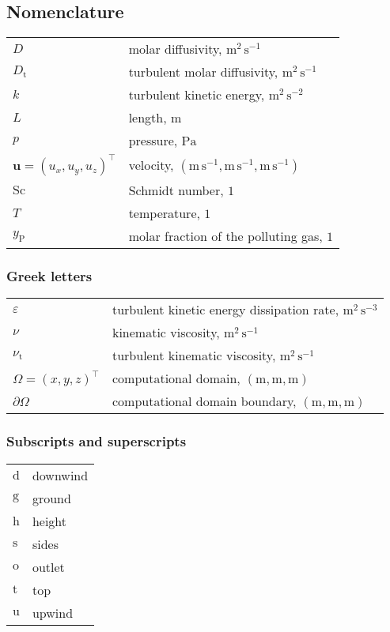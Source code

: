\cleardoublepage
\subsection*{Nomenclature}
\label{sec:nomen}

\begin{tabular}{ll}
$D$ & molar diffusivity, $\mathrm{m^2\,s^{-1}}$ \\
$D_{\mathrm{t}}$ & turbulent molar diffusivity, $\mathrm{m^2\,s^{-1}}$ \\
$k$ & turbulent kinetic energy, $\mathrm{m^2\,s^{-2}}$ \\
$L$ & length, $\mathrm{m}$ \\
$p$ & pressure, $\mathrm{Pa}$ \\
$\bm{u} = (u_x, u_y, u_z)^\intercal$ & velocity, $\mathrm{(m\,s^{-1},m\,s^{-1},m\,s^{-1})}$ \\
$\mathrm{Sc}$ & Schmidt number, $\mathrm{1}$ \\
${T}$ & temperature, $\mathrm{1}$ \\
$y_{\mathrm{P}}$ & molar fraction of the polluting gas, $\mathrm{1}$ \\
\end{tabular}

\subsubsection*{Greek letters}
\begin{tabular}{ll}
$\varepsilon$ & turbulent kinetic energy dissipation rate, $\mathrm{m^2\,s^{-3}}$\\
$\nu$ & kinematic viscosity, $\mathrm{m^2\,s^{-1}}$\\
$\nu_{\mathrm{t}}$ & turbulent kinematic viscosity, $\mathrm{m^2\,s^{-1}}$\\
$\Omega = (x,y,z)^\intercal$ & computational domain, $\mathrm{(m,m,m)}$\\
$\partial\Omega$ & computational domain boundary, $\mathrm{(m,m,m)}$\\
\end{tabular}

\subsubsection*{Subscripts and superscripts}
\begin{tabular}{ll}
$\mathrm{d}$ & downwind \\
$\mathrm{g}$ & ground \\
$\mathrm{h}$ & height \\
$\mathrm{s}$ & sides \\
$\mathrm{o}$ & outlet \\
$\mathrm{t}$ & top \\
$\mathrm{u}$ & upwind \\
\end{tabular}

